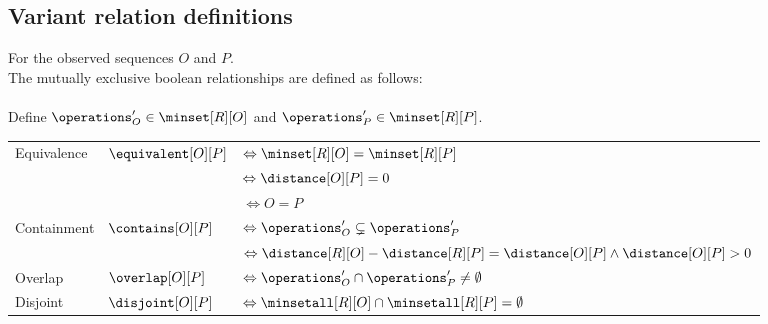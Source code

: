 \subsection*{Variant relation definitions}
%
For the observed sequences $O$ and $P$.\\
The mutually exclusive boolean relationships are defined as follows: \\
\\
Define $\operations_O' \in \minset[R][O]$ and $\operations_P' \in \minset[R][P]$.\\
%
\begin{table}[h!]
    \begin{tabular}{l l l}
        Equivalence & $\equivalent[O][P]$ & $\Leftrightarrow \minset[R][O] = \minset[R][P]$ \\
                    &                     & $\Leftrightarrow \distance[O][P] = 0$ \\
                    &                     &  $\Leftrightarrow O = P$ \\
        Containment & $\contains[O][P]$   & $\Leftrightarrow \operations_O' \subsetneq \operations_P'$ \\ %
                    &                     & $\Leftrightarrow \distance[R][O] - \distance[R][P] = \distance[O][P] \land \distance[O][P] > 0$ \\
        Overlap     & $\overlap[O][P]$    & $\Leftrightarrow \operations_O' \cap \operations_P' \ne \emptyset$ \\ %
        Disjoint   & $\disjoint[O][P]$    & $\Leftrightarrow \minsetall[R][O] \cap \minsetall[R][P] = \emptyset$ \\
    \end{tabular}
\end{table}
%
